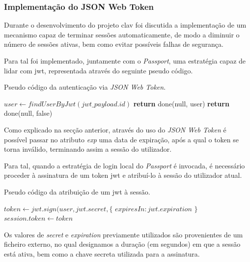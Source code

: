 \cleardoublepage
\subsubsection{Implementação do JSON Web Token}

Durante o desenvolvimento do projeto \gls{clav} foi discutida a implementação de um mecanismo capaz de terminar sessões automaticamente, de modo a diminuir o número de sessões ativas, bem como evitar possíveis falhas de segurança.

Para tal foi implementado, juntamente com o \emph{Passport}, uma estratégia capaz de lidar com \gls{jwt}, representada através do seguinte pseudo código.

\begin{algorithm}
    \caption{Pseudo código da autenticação via \emph{JSON Web Token}.}
    \begin{algorithmic}[1]
        \State $user \gets findUserByJwt(jwt\_payload.id)$
            \State \textbf{return} done(null, user)
        \Else
            \State \textbf{return} done(null, false)
        \EndIf
    \EndFunction
    \end{algorithmic}
\end{algorithm}

Como explicado na secção anterior, através do uso do \emph{JSON Web Token} é possível passar no atributo \emph{exp} uma data de expiração, após a qual o token se torna inválido, terminando assim a sessão do utilizador.

Para tal, quando a estratégia de login local do \emph{Passport} é invocada, é necessário proceder à assinatura de um token \gls{jwt} e atribuí-lo à sessão do utilizador atual.

\begin{algorithm}
    \caption{Pseudo código da atribuição de um \gls{jwt} à sessão.}
    \begin{algorithmic}[1]
        \State $token \gets jwt.sign({user}, jwt.secret, \{$
        \State \indent $expiresIn : jwt.expiration$
        \State $\}$
        \State $session.token \gets token$
    \EndFunction
    \end{algorithmic}
\end{algorithm}

Os valores de \emph{secret} e \emph{expiration} previamente utilizados são provenientes de um ficheiro externo, no qual designamos a duração (em segundos) em que a sessão está ativa, bem como a chave secreta utilizada para a assinatura.

